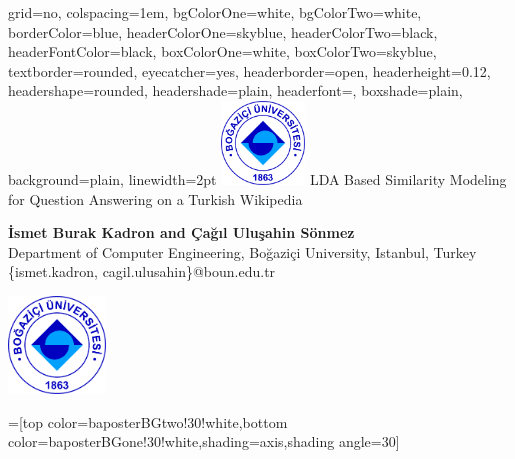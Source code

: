 \documentclass[landscape,final]{baposter}
\begin{document}
\begin{poster}{
  grid=no,
  colspacing=1em,
  bgColorOne=white,
  bgColorTwo=white,
  borderColor=blue,
  headerColorOne=skyblue,
  headerColorTwo=black,
  headerFontColor=black,
  boxColorOne=white,
  boxColorTwo=skyblue,
  textborder=rounded,
  eyecatcher=yes,
  headerborder=open,
  headerheight=0.12\textheight,
  headershape=rounded,
  headershade=plain,
  headerfont=\Large\textsf, %
  boxshade=plain,
  background=plain,
  linewidth=2pt
  }
  {\includegraphics[height=6em]{figures/Bogazici_University_Logo.png}} %
  {\sf \vspace{5pt}%
  \vspace{-14pt}
  LDA Based Similarity Modeling for Question Answering on a Turkish Wikipedia
}
  {\sf \Large \vspace{5pt} %
  	\textbf{İsmet Burak Kadron and Çağıl Uluşahin Sönmez}\\
    Department of Computer Engineering, Bo\u{g}azi\c{c}i University, Istanbul, Turkey\\
    \{ismet.kadron, cagil.ulusahin\}@boun.edu.tr

  }
  {\includegraphics[height=7em]{figures/Bogazici_University_Logo.png}
  }

  =[top color=baposterBGtwo!30!white,bottom color=baposterBGone!30!white,shading=axis,shading angle=30]

     \newlength{\leftimgwidth}
     \setlength{\leftimgwidth}{0.78em+8.0em}


\end{poster}
\end{document}
